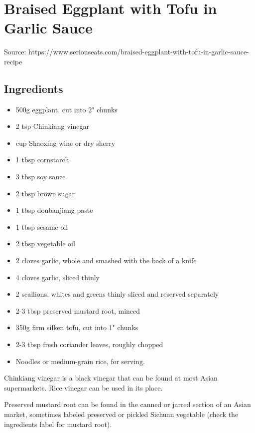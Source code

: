 \clearpage
\section{Braised Eggplant with Tofu in Garlic Sauce}


Source: https://www.seriouseats.com/braised-eggplant-with-tofu-in-garlic-sauce-recipe

\subsection{Ingredients}

\begin{itemize}
    \item 500g eggplant, cut into 2" chunks
    \item 2 tsp Chinkiang vinegar
    \item {} cup Shaoxing wine or dry sherry
    \item 1 tbsp cornstarch
    \item 3 tbsp soy sauce
    \item 2 tbsp brown sugar
    \item 1 tbsp doubanjiang paste
    \item 1 tbsp sesame oil
    \item 2 tbsp vegetable oil
    \item 2 cloves garlic, whole and smashed with the back of a knife
    \item 4 cloves garlic, sliced thinly
    \item 2 scallions, whites and greens thinly sliced and reserved separately
    \item 2-3 tbsp preserved mustard root, minced
    \item 350g firm silken tofu, cut into 1" chunks
    \item 2-3 tbsp fresh coriander leaves, roughly chopped
    \item Noodles or medium-grain rice, for serving.
\end{itemize}

Chinkiang vinegar is a black vinegar that can be found at most Asian supermarkets. Rice vinegar can be used in its place.

Preserved mustard root can be found in the canned or jarred section of an Asian market, sometimes labeled preserved or pickled Sichuan vegetable (check the ingredients label for mustard root).

